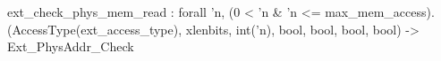 ext_check_phys_mem_read : forall 'n, (0 < 'n & 'n <= max_mem_access).
  (AccessType(ext_access_type), xlenbits, int('n), bool, bool, bool, bool) -> Ext_PhysAddr_Check